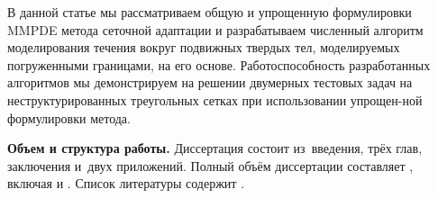 В данной статье мы рассматриваем общую и упрощенную формулировки MMPDE метода сеточной адаптации и разрабатываем численный алгоритм моделирования течения вокруг подвижных твердых тел, моделируемых погруженными границами, на его основе. Работоспособность разработанных алгоритмов мы демонстрируем на решении двумерных тестовых задач на неструктурированных треугольных сетках при использовании упрощен-ной формулировки метода.

\newcommand{\actuality}{}
\newcommand{\progress}{}
\newcommand{\aim}{{\textbf\aimTXT}}
\newcommand{\tasks}{\textbf{\tasksTXT}}
\newcommand{\novelty}{\textbf{\noveltyTXT}}
\newcommand{\influence}{\textbf{\influenceTXT}}
\newcommand{\methods}{\textbf{\methodsTXT}}
\newcommand{\defpositions}{\textbf{\defpositionsTXT}}
\newcommand{\reliability}{\textbf{\reliabilityTXT}}
\newcommand{\probation}{\textbf{\probationTXT}}
\newcommand{\contribution}{\textbf{\contributionTXT}}
\newcommand{\publications}{\textbf{\publicationsTXT}}


\textbf{Объем и структура работы.} Диссертация состоит из~введения, трёх глав,
заключения и~двух приложений.
%
Полный объём диссертации составляет
, включая
 и
.   Список литературы содержит
.


